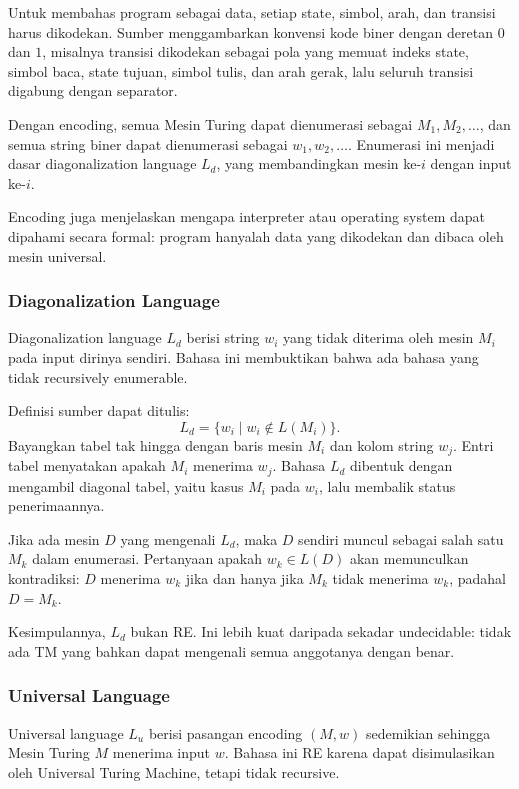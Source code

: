 Untuk membahas program sebagai data, setiap state, simbol, arah, dan transisi harus dikodekan. Sumber menggambarkan konvensi kode biner dengan deretan $0$ dan $1$, misalnya transisi dikodekan sebagai pola yang memuat indeks state, simbol baca, state tujuan, simbol tulis, dan arah gerak, lalu seluruh transisi digabung dengan separator.

Dengan encoding, semua Mesin Turing dapat dienumerasi sebagai $M_1,M_2,\ldots$, dan semua string biner dapat dienumerasi sebagai $w_1,w_2,\ldots$. Enumerasi ini menjadi dasar diagonalization language $L_d$, yang membandingkan mesin ke-$i$ dengan input ke-$i$.

Encoding juga menjelaskan mengapa interpreter atau operating system dapat dipahami secara formal: program hanyalah data yang dikodekan dan dibaca oleh mesin universal.

\subsubsection{Diagonalization Language}

\begin{jawab}
Diagonalization language $L_d$ berisi string $w_i$ yang tidak diterima oleh mesin $M_i$ pada input dirinya sendiri. Bahasa ini membuktikan bahwa ada bahasa yang tidak recursively enumerable.
\end{jawab}

Definisi sumber dapat ditulis:
\[
    L_d=\{w_i\mid w_i\notin L(M_i)\}.
\]
Bayangkan tabel tak hingga dengan baris mesin $M_i$ dan kolom string $w_j$. Entri tabel menyatakan apakah $M_i$ menerima $w_j$. Bahasa $L_d$ dibentuk dengan mengambil diagonal tabel, yaitu kasus $M_i$ pada $w_i$, lalu membalik status penerimaannya.

Jika ada mesin $D$ yang mengenali $L_d$, maka $D$ sendiri muncul sebagai salah satu $M_k$ dalam enumerasi. Pertanyaan apakah $w_k\in L(D)$ akan memunculkan kontradiksi: $D$ menerima $w_k$ jika dan hanya jika $M_k$ tidak menerima $w_k$, padahal $D=M_k$.

Kesimpulannya, $L_d$ bukan RE. Ini lebih kuat daripada sekadar undecidable: tidak ada TM yang bahkan dapat mengenali semua anggotanya dengan benar.

\subsubsection{Universal Language}

\begin{jawab}
Universal language $L_u$ berisi pasangan encoding $(M,w)$ sedemikian sehingga Mesin Turing $M$ menerima input $w$. Bahasa ini RE karena dapat disimulasikan oleh Universal Turing Machine, tetapi tidak recursive.
\end{jawab}

